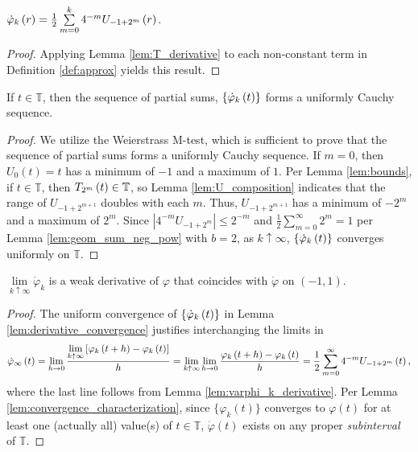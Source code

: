 \begin{lemma}
  \label{lem:varphi_k_derivative}
  $\dotvarphi[r]{k} = \frac{1}{2} \sum\limits_{m = 0}^k 4^{-m} U_{-1 + 2^m}\left(r\right)$.
\end{lemma}
\begin{proof}
  Applying Lemma \ref{lem:T_derivative} to each non-constant term in Definition \ref{def:approx} yields this result.
\end{proof}

\begin{lemma}
  \label{lem:derivative_convergence}
  If $t \in \mathbb{T}$, then the sequence of partial sums, $\{\dotvarphi[t]{k}\}$ forms a uniformly Cauchy sequence.
\end{lemma}
\begin{proof}
  We utilize the Weierstrass M-test, which is sufficient to prove that the sequence of partial sums forms a uniformly Cauchy sequence. If $m = 0$, then $U_0\left(t\right) = t$ has a minimum of $-1$ and a maximum of $1$. Per Lemma \ref{lem:bounds}, if $t \in \mathbb{T}$, then $\TT[t]{m} \in \mathbb{T}$, so Lemma \ref{lem:U_composition} indicates that the range of $U_{-1 + 2^{m + 1}}$ doubles with each $m$. Thus, $U_{-1 + 2^{m + 1}}$ has a minimum of $-2^m$ and a maximum of $2^m$. Since $\left|4^{-m} U_{-1 + 2^m}\right| \leq 2^{-m}$ and $\frac{1}{2}\sum\limits_{m = 0}^\infty 2^m = 1$ per Lemma \ref{lem:geom_sum_neg_pow} with $b = 2$, as $k \uparrow \infty$, $\{\dotvarphi[t]{k}\}$ converges uniformly on $\mathbb{T}$.
\end{proof}

\begin{lemma}
  \label{lem:weak_deriv}
  $\lim\limits_{k \uparrow \infty} \dot{\varphi}_k$ is a weak derivative of $\varphi$ that coincides with $\dot{\varphi}$ on $\left(-1,1\right)$. 
\end{lemma}
\begin{proof}
  The uniform convergence of $\{\dotvarphi[t]{k}\}$ in Lemma \ref{lem:derivative_convergence} justifies interchanging the limits in
  \begin{eqnarray*}
  \dotvarphi[t]{\infty} = \lim\limits_{h \rightarrow 0} \frac{\lim\limits_{k \uparrow \infty} \left[\varphi_k\left(t + h\right) - \varphi_k\left(t\right)\right]}{h} =
  \lim\limits_{k \uparrow \infty} \lim\limits_{h \rightarrow 0} \frac{\varphi_k\left(t + h\right) - \varphi_k\left(t\right)}{h} =
  \frac{1}{2} \sum\limits_{m = 0}^\infty 4^{-m} U_{-1 + 2^m}\left(t\right),
  \end{eqnarray*}
  where the last line follows from Lemma \ref{lem:varphi_k_derivative}. Per Lemma \ref{lem:convergence_characterization}, since $\{\varphi_k\left(t\right)\}$ converges to $\varphi\left(t\right)$ for at least one (actually all) value(s) of $t \in \mathbb{T}$, $\dot{\varphi}\left(t\right)$ exists on any proper \emph{subinterval} of $\mathbb{T}$.
\end{proof}

